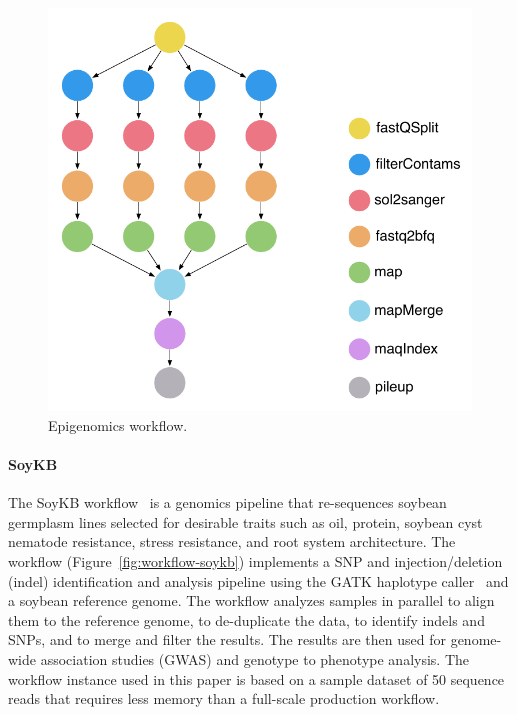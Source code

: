 \documentclass[final,5p,times,twocolumn]{elsarticle}
\begin{document}
\begin{figure}[!htb]
	\centering
	\includegraphics[width=0.75\linewidth]{figures/workflow-genome}
	\caption{Epigenomics workflow.}
	\label{fig:workflow-genome}
\end{figure}

\paragraph{\textbf{SoyKB}}
The SoyKB workflow~\cite{soybean, Joshi01012014} is a genomics pipeline 
that re-sequences soybean germplasm lines selected for desirable traits such 
as oil, protein, soybean cyst nematode resistance, stress resistance, and root 
system architecture. The workflow (Figure~\ref{fig:workflow-soykb}) 
implements a SNP and injection/deletion (indel) identification and analysis 
pipeline using the GATK haplotype caller~\cite{gatk} and a soybean reference 
genome. The workflow analyzes samples in parallel to align them to the reference 
genome, to de-duplicate the data, to identify indels and SNPs, and to merge and 
filter the results. The results are then used for genome-wide association studies 
(GWAS) and genotype to phenotype analysis. The workflow instance used in this 
paper is based on a sample dataset of 50 sequence reads that requires less 
memory than a full-scale production workflow.
\end{document}
